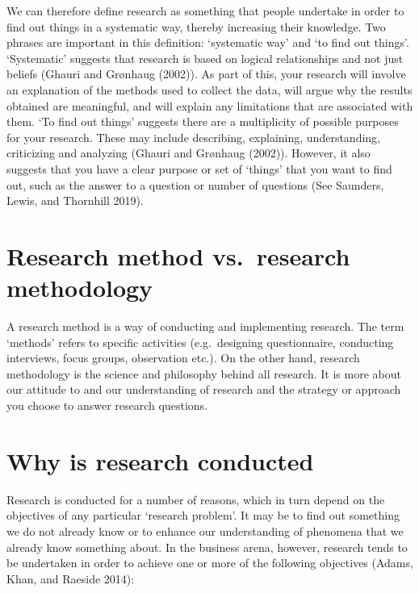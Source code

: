 \documentclass[
  letterpaper,
  DIV=11,
  numbers=noendperiod]{scrreprt}
\begin{document}
We can therefore define research as something that people undertake in
order to find out things in a systematic way, thereby increasing their
knowledge. Two phrases are important in this definition: `systematic
way' and `to find out things'. `Systematic' suggests that research is
based on logical relationships and not just beliefs (Ghauri and Grønhaug
(2002)). As part of this, your research will involve an explanation of
the methods used to collect the data, will argue why the results
obtained are meaningful, and will explain any limitations that are
associated with them. `To find out things' suggests there are a
multiplicity of possible purposes for your research. These may include
describing, explaining, understanding, criticizing and analyzing (Ghauri
and Grønhaug (2002)). However, it also suggests that you have a clear
purpose or set of `things' that you want to find out, such as the answer
to a question or number of questions (See Saunders, Lewis, and Thornhill
2019).

\section{Research method vs.~research
methodology}\label{research-method-vs.-research-methodology}

A research method is a way of conducting and implementing research. The
term `methods' refers to specific activities (e.g.~designing
questionnaire, conducting interviews, focus groups, observation etc.).
On the other hand, research methodology is the science and philosophy
behind all research. It is more about our attitude to and our
understanding of research and the strategy or approach you choose to
answer research questions.

\section{Why is research conducted}\label{why-is-research-conducted}

Research is conducted for a number of reasons, which in turn depend on
the objectives of any particular `research problem'. It may be to find
out something we do not already know or to enhance our understanding of
phenomena that we already know something about. In the business arena,
however, research tends to be undertaken in order to achieve one or more
of the following objectives (Adams, Khan, and Raeside 2014):
\end{document}
